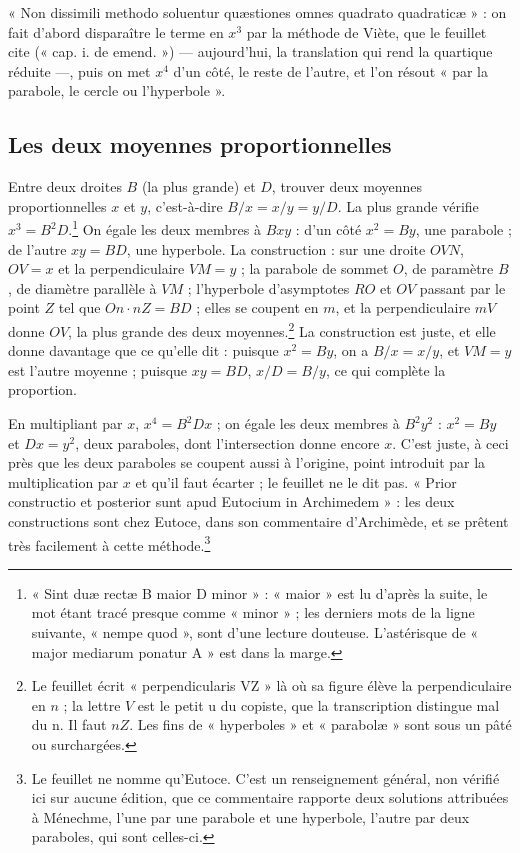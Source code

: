\documentclass[11pt,a4paper]{article}
\begin{document}
« Non dissimili methodo soluentur quæstiones omnes quadrato quadraticæ » : on
fait d'abord disparaître le terme en $x^3$ par la méthode de Viète, que le
feuillet cite (« cap. i. de emend. ») — aujourd'hui, la translation qui rend
la quartique réduite —, puis on met $x^4$ d'un côté, le reste de l'autre, et
l'on résout « par la parabole, le cercle ou l'hyperbole ».

\subsection*{Les deux moyennes proportionnelles}

Entre deux droites $B$ (la plus grande) et $D$, trouver deux moyennes
proportionnelles $x$ et $y$, c'est-à-dire $B/x = x/y = y/D$. La plus grande
vérifie $x^3 = B^2D$.\footnote{« Sint duæ rectæ B maior D minor » : « maior »
est lu d'après la suite, le mot étant tracé presque comme « minor » ; les
derniers mots de la ligne suivante, « nempe quod », sont d'une lecture
douteuse. L'astérisque de « major mediarum ponatur A » est dans la marge.} On
égale les deux membres à $Bxy$ : d'un côté $x^2 = By$, une parabole ; de l'autre
$xy = BD$, une hyperbole. La construction : sur une droite $OVN$, $OV = x$ et
la perpendiculaire $VM = y$ ; la parabole de sommet $O$, de paramètre $B$, de
diamètre parallèle à $VM$ ; l'hyperbole d'asymptotes $RO$ et $OV$ passant par le
point $Z$ tel que $On\cdot nZ = BD$ ; elles se coupent en $m$, et la
perpendiculaire $mV$ donne $OV$, la plus grande des deux
moyennes.\footnote{Le feuillet écrit « perpendicularis VZ » là où sa figure élève
la perpendiculaire en $n$ ; la lettre $V$ est le petit u du copiste, que la
transcription distingue mal du n. Il faut $nZ$. Les fins de « hyperboles » et
« parabolæ » sont sous un pâté ou surchargées.} La construction est juste, et
elle donne davantage que ce qu'elle dit : puisque $x^2 = By$, on a $B/x = x/y$,
et $VM = y$ est l'autre moyenne ; puisque $xy = BD$, $x/D = B/y$, ce qui
complète la proportion.

En multipliant par $x$, $x^4 = B^2Dx$ ; on égale les deux membres à $B^2y^2$ :
$x^2 = By$ et $Dx = y^2$, deux paraboles, dont l'intersection donne encore
$x$. C'est juste, à ceci près que les deux paraboles se coupent aussi à
l'origine, point introduit par la multiplication par $x$ et qu'il faut écarter ;
le feuillet ne le dit pas. « Prior constructio et posterior sunt apud Eutocium
in Archimedem » : les deux constructions sont chez Eutoce, dans son commentaire
d'Archimède, et se prêtent très facilement à cette méthode.\footnote{Le feuillet
ne nomme qu'Eutoce. C'est un renseignement général, non vérifié ici sur aucune
édition, que ce commentaire rapporte deux solutions attribuées à Ménechme, l'une
par une parabole et une hyperbole, l'autre par deux paraboles, qui sont
celles-ci.}
\end{document}
